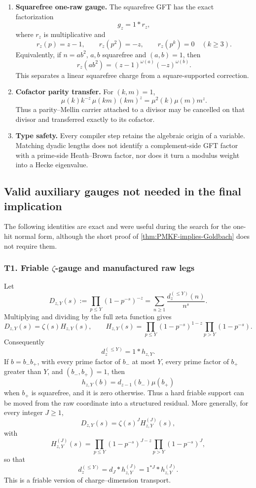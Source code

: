 \documentclass[11pt]{article}
\theoremstyle{definition}
\theoremstyle{remark}
\newcommand{\1}{\mathbf 1}
\begin{document}
\begin{enumerate}[label=\textbf{G\arabic*.},leftmargin=3em]
\item \textbf{Squarefree one-raw gauge.}
The squarefree GFT has the exact factorization
\[
 g_z=1*r_z,
\]
where \(r_z\) is multiplicative and
\[
 r_z(p)=z-1,\qquad r_z(p^2)=-z,\qquad r_z(p^k)=0\quad(k\ge3).
\]
Equivalently, if \(n=ab^2\), \(a,b\) squarefree and \((a,b)=1\), then
\[
 r_z(ab^2)=(z-1)^{\omega(a)}(-z)^{\omega(b)}.
\]
This separates a linear squarefree charge from a square-supported correction.

\item \textbf{Cofactor parity transfer.}
For \((k,m)=1\),
\[
 \mu(k)k^{-z}\,\mu(km)(km)^z
 =\mu^2(k)\mu(m)m^z.
\]
Thus a parity--Mellin carrier attached to a divisor may be cancelled on that
divisor and transferred exactly to its cofactor.

\item \textbf{Type safety.}
Every compiler step retains the algebraic origin of a variable.  Matching dyadic
lengths does not identify a complement-side GFT factor with a prime-side
Heath--Brown factor, nor does it turn a modulus weight into a Hecke eigenvalue.
\end{enumerate}

\subsection{Valid auxiliary gauges not needed in the final implication}

The following identities are exact and were useful during the search for the
one-hit normal form, although the short proof of \cref{thm:PMKF-implies-Goldbach}
does not require them.

\subsubsection*{T1. Friable \(\zeta\)-gauge and manufactured raw legs}

Let
\[
 D_{z,Y}(s):=\prod_{p\le Y}(1-p^{-s})^{-z}
 =\sum_{n\ge1}\frac{d_z^{(\le Y)}(n)}{n^s}.
\]
Multiplying and dividing by the full zeta function gives
\begin{equation}\label{eq:tool-friable-zeta-gauge}
 D_{z,Y}(s)=\zeta(s)H_{z,Y}(s),
 \qquad
 H_{z,Y}(s)
 =\prod_{p\le Y}(1-p^{-s})^{1-z}
  \prod_{p>Y}(1-p^{-s}).
\end{equation}
Consequently
\[
 d_z^{(\le Y)}=1*h_{z,Y}.
\]
If \(b=b_-b_+\), with every prime factor of \(b_-\) at most \(Y\), every
prime factor of \(b_+\) greater than \(Y\), and \((b_-,b_+)=1\), then
\begin{equation}\label{eq:tool-hzy}
 h_{z,Y}(b)=d_{z-1}(b_-)\mu(b_+)
\end{equation}
when \(b_+\) is squarefree, and it is zero otherwise.  Thus a hard friable
support can be moved from the raw coordinate into a structured residual.
More generally, for every integer \(J\ge1\),
\[
 D_{z,Y}(s)=\zeta(s)^J H^{(J)}_{z,Y}(s),
\]
with
\[
 H^{(J)}_{z,Y}(s)
 =\prod_{p\le Y}(1-p^{-s})^{J-z}
  \prod_{p>Y}(1-p^{-s})^J,
\]
so that
\[
 d_z^{(\le Y)}=d_J*h^{(J)}_{z,Y}=1^{*J}*h^{(J)}_{z,Y}.
\]
This is a friable version of charge--dimension transport.
\end{document}
